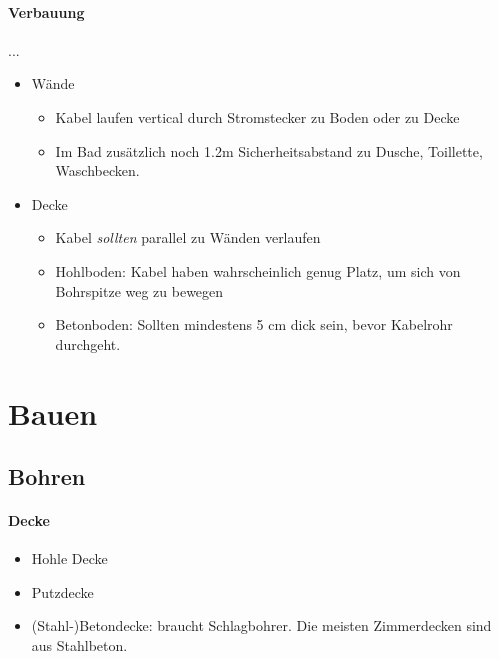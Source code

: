\paragraph{Verbauung}...
\begin{itemize}
    \item Wände \begin{itemize}
        \item Kabel laufen vertical durch Stromstecker zu Boden oder zu Decke
        \item Im Bad zusätzlich noch 1.2m Sicherheitsabstand zu Dusche, Toillette, Waschbecken.
    \end{itemize}
    \item Decke \begin{itemize}
        \item Kabel \emph{sollten} parallel zu Wänden verlaufen
        \item Hohlboden: Kabel haben wahrscheinlich genug Platz, um sich von Bohrspitze weg zu bewegen
        \item Betonboden: Sollten mindestens 5 cm dick sein, bevor Kabelrohr durchgeht.
    \end{itemize}
\end{itemize}




\section{Bauen}

\subsection{Bohren}

\paragraph{Decke}
\begin{itemize}
    \item Hohle Decke
    \item Putzdecke
    \item (Stahl-)Betondecke: braucht Schlagbohrer. Die meisten Zimmerdecken sind aus Stahlbeton.
\end{itemize}
